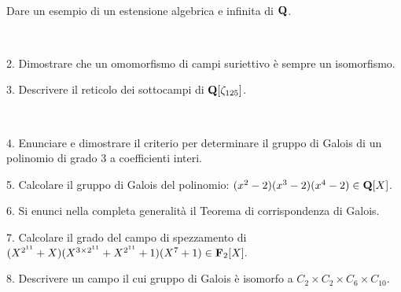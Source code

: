 \ \dotfill\ \bigskip\bigskip\bigskip\vfil

 Dare un esempio di un estensione algebrica e infinita di ${\bf Q}$.\medskip\bigskip\bigskip

\ \dotfill\ \bigskip\bigskip\bigskip


\vfil\eject


\item{2.} Dimostrare che un omomorfismo di campi suriettivo \`e sempre un isomorfismo.

\vv


\item{3.} Descrivere il reticolo dei sottocampi di ${\bf Q}[\zeta_{125}]$.

\ve\ \vs


\item{4.} Enunciare e dimostrare il criterio per determinare il gruppo di Galois di un polinomio di grado $3$ a coefficienti interi.\vv

\item{5.} Calcolare il gruppo di Galois del polinomio: $(x^2-2)(x^3-2)(x^4-2)\in{\bf Q}[X]$.
\ve\ \vs


\item{6.} Si enunci nella completa generalit\`a il Teorema di
corrispondenza di Galois.\vv\vv


\item{7.} Calcolare il grado del campo di spezzamento di 
$(X^{2^{11}}+X)(X^{3\times 2^{11}}+X^{2^{11}}+1)(X^{7}+1)\in{\bf F}_2[X].$\vv\vv

\item{8.} Descrivere un campo il cui gruppo di Galois \`e isomorfo a $C_2\times C_2\times C_6\times C_10$.


\vv



\ \vst
 \bye
